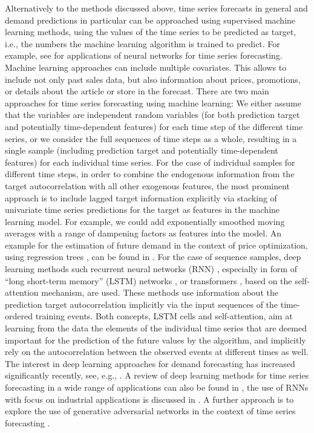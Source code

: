 \documentclass[BCOR=1mm, DIV=calc,10pt,
twoside=true,
twocolumn,
headings=normal]{scrartcl}
\begin{document}
Alternatively to the methods discussed above, time series forecasts in general and demand predictions in particular can be approached using supervised machine learning methods, using the values of the time series to be predicted as target, i.e., the numbers the machine learning algorithm is trained to predict.  For example, see \cite{Zhang2012,remus2001neural} for applications of neural networks for time series forecasting. Machine learning approaches can include multiple covariates. This allows to include not only past sales data, but also information about prices, promotions, or details about the article or store in the forecast. There are two main approaches for time series forecasting using  machine learning: We either assume that the variables are independent random variables (for both prediction target and potentially time-dependent features) for each time step of the different time series, or we consider the full sequences of time steps as a whole, resulting in a single sample (including prediction target and potentially time-dependent features) for each individual time series. For the case of individual samples for different time steps, in order to combine the endogenous information from the target autocorrelation with all other exogenous features, the most prominent approach is to include lagged target information explicitly via stacking of univariate time series predictions for the target as features in the machine learning model. For example, we could add exponentially smoothed moving averages with a range of dampening factors as features into the model. An example for the estimation of future demand in the context of price optimization, using regression trees \cite{breiman1984}, can be found in \cite{ferreira2016analytics}. For the case of sequence samples, deep learning methods such recurrent neural networks (RNN) \cite{rnn}, especially in form of ``long short-term memory'' (LSTM) networks \cite{hochreiter1997long}, or transformers \cite{transformer}, based on the self-attention mechanism, are used. These methods use information about the prediction target autocorrelation implicitly via the input sequences of the time-ordered training events. Both concepts, LSTM cells and self-attention, aim at learning from the data the elements of the individual time series that are deemed important for the prediction of the future values by the algorithm, and implicitly rely on the autocorrelation between the observed events at different times as well. The interest in deep learning approaches for demand forecasting has increased significantly recently, see, e.g., \cite{bandara2019sales,yu2017application, goyal2018solution,helmini2019sales, golkabek2020demand}. A review of deep learning methods for time series forecasting in a wide range of applications can also be found in \cite{langkvist2014review}, the use of RNNs with focus on industrial applications is discussed in \cite{dixon2020industrial}. A further approach is to explore the use of generative adversarial networks \cite{goodfellow2014generative} in the context of time series forecasting \cite{haas2020statistical, ramponi2018t, smith2020conditional}. 
\end{document}
